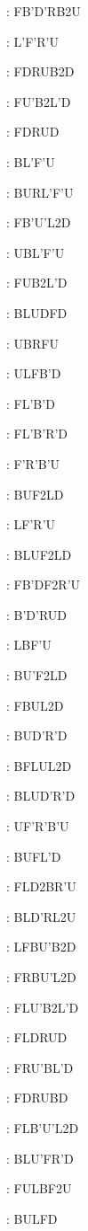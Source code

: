 \documentclass[9pt]{article}
\begin{document}
{\begin{multicols}{6}
: FB'D'RB2U

: L'F'R'U

: FDRUB2D

: FU'B2L'D

: FDRUD

: BL'F'U

: BURL'F'U

: FB'U'L2D

: UBL'F'U

: FUB2L'D

: BLUDFD

: UBRFU

: ULFB'D

: FL'B'D

: FL'B'R'D

: F'R'B'U

: BUF2LD

: LF'R'U

: BLUF2LD

: FB'DF2R'U

: B'D'RUD

: LBF'U

: BU'F2LD

: FBUL2D

: BUD'R'D

: BFLUL2D

: BLUD'R'D

: UF'R'B'U

: BUFL'D

: FLD2BR'U

: BLD'RL2U

: LFBU'B2D

: FRBU'L2D

: FLU'B2L'D

: FLDRUD

: FRU'BL'D

: FDRUBD

: FLB'U'L2D

: BLU'FR'D

: FULBF2U

: BULFD


\end{multicols}}
\end{document}
